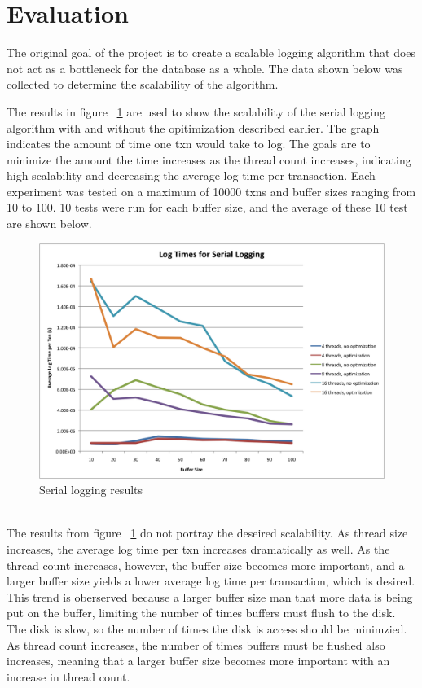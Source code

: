\section{Evaluation}


The original goal of the project is to create a scalable logging algorithm that does not act as a bottleneck for the database as a whole. The data shown below was collected to determine the scalability of the algorithm. \par

The results in figure ~\ref{serialresults} are used to show the scalability of the serial logging algorithm with and without the  opitimization described earlier.  The graph indicates the amount of time one txn would take to log. The goals are to minimize the amount the time increases as the thread count increases, indicating high scalability and decreasing the average log time per transaction. Each experiment  was tested on a maximum of 10000 txns and buffer sizes ranging from 10 to 100. 10 tests were run for each buffer size, and the average of these 10 test are shown below. \par 

\begin{figure}[!h]
  \includegraphics[width=\textwidth]{results.png}
  \caption{Serial logging results}
  \label{serialresults}
\end{figure}\\

The results from figure ~\ref{serialresults} do not portray the deseired scalability. As thread size increases, the average log time per txn increases dramatically as well. As the thread count increases, however, the buffer size becomes more important, and a larger buffer size yields a lower average log time per transaction, which is desired. This trend is oberserved because a larger buffer size man that more data is being put on the buffer, limiting the number of times buffers must flush to the disk. The disk is slow, so the number of times the disk is access should be minimzied. As thread count increases, the number of times buffers must be flushed also increases, meaning that a larger buffer size becomes more important with an increase in thread count. \par


